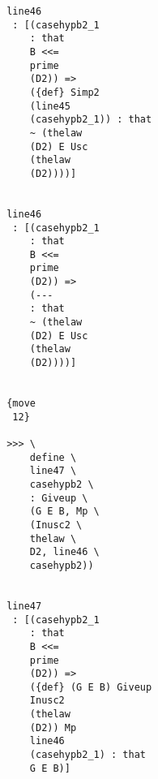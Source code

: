 \documentclass[12pt]{article}
\begin{document}
\begin{verbatim}
                                       line46 
                                        : [(casehypb2_1 
                                           : that 
                                           B <<= 
                                           prime 
                                           (D2)) => 
                                           ({def} Simp2 
                                           (line45 
                                           (casehypb2_1)) : that 
                                           ~ (thelaw 
                                           (D2) E Usc 
                                           (thelaw 
                                           (D2))))]


                                       line46 
                                        : [(casehypb2_1 
                                           : that 
                                           B <<= 
                                           prime 
                                           (D2)) => 
                                           (--- 
                                           : that 
                                           ~ (thelaw 
                                           (D2) E Usc 
                                           (thelaw 
                                           (D2))))]


                                       {move 
                                        12}

                                       >>> \
                                           define \
                                           line47 \
                                           casehypb2 \
                                           : Giveup \
                                           (G E B, Mp \
                                           (Inusc2 \
                                           thelaw \
                                           D2, line46 \
                                           casehypb2))


                                       line47 
                                        : [(casehypb2_1 
                                           : that 
                                           B <<= 
                                           prime 
                                           (D2)) => 
                                           ({def} (G E B) Giveup 
                                           Inusc2 
                                           (thelaw 
                                           (D2)) Mp 
                                           line46 
                                           (casehypb2_1) : that 
                                           G E B)]



\end{verbatim}
\end{document}
